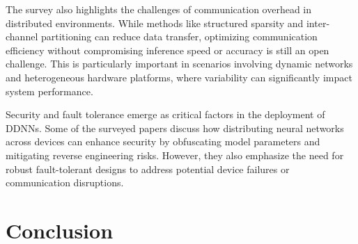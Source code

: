 \documentclass[conference]{IEEEtran}
\begin{document}
The survey also highlights the challenges of communication overhead in distributed environments. While methods like structured sparsity and inter-channel partitioning can reduce data transfer, optimizing communication efficiency without compromising inference speed or accuracy is still an open challenge. This is particularly important in scenarios involving dynamic networks and heterogeneous hardware platforms, where variability can significantly impact system performance.

Security and fault tolerance emerge as critical factors in the deployment of DDNNs. Some of the surveyed papers discuss how distributing neural networks across devices can enhance security by obfuscating model parameters and mitigating reverse engineering risks. However, they also emphasize the need for robust fault-tolerant designs to address potential device failures or communication disruptions.



\section{Conclusion}






\end{document}
